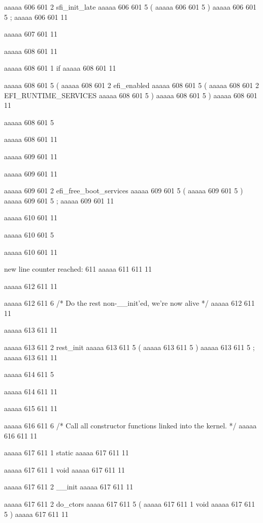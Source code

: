 {aaaaa 606 601
2
sfi_init_late
aaaaa 606 601
5
(
aaaaa 606 601
5
)
aaaaa 606 601
5
;
aaaaa 606 601
11


aaaaa 607 601
11


aaaaa 608 601
11
	
aaaaa 608 601
1
if
aaaaa 608 601
11
 
aaaaa 608 601
5
(
aaaaa 608 601
2
efi_enabled
aaaaa 608 601
5
(
aaaaa 608 601
2
EFI_RUNTIME_SERVICES
aaaaa 608 601
5
)
aaaaa 608 601
5
)
aaaaa 608 601
11
 
aaaaa 608 601
5
{
aaaaa 608 601
11


aaaaa 609 601
11
	
aaaaa 609 601
11
	
aaaaa 609 601
2
efi_free_boot_services
aaaaa 609 601
5
(
aaaaa 609 601
5
)
aaaaa 609 601
5
;
aaaaa 609 601
11


aaaaa 610 601
11
	
aaaaa 610 601
5
}
aaaaa 610 601
11


new line counter reached: 611
aaaaa 611 611
11


aaaaa 612 611
11
	
aaaaa 612 611
6
/* Do the rest non-__init'ed, we're now alive */
aaaaa 612 611
11


aaaaa 613 611
11
	
aaaaa 613 611
2
rest_init
aaaaa 613 611
5
(
aaaaa 613 611
5
)
aaaaa 613 611
5
;
aaaaa 613 611
11


aaaaa 614 611
5
}
aaaaa 614 611
11


aaaaa 615 611
11


aaaaa 616 611
6
/* Call all constructor functions linked into the kernel. */
aaaaa 616 611
11


aaaaa 617 611
1
static
aaaaa 617 611
11
 
aaaaa 617 611
1
void
aaaaa 617 611
11
 
aaaaa 617 611
2
__init
aaaaa 617 611
11
 
aaaaa 617 611
2
do_ctors
aaaaa 617 611
5
(
aaaaa 617 611
1
void
aaaaa 617 611
5
)
aaaaa 617 611
11


